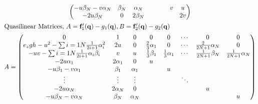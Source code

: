 \documentclass[oneside]{article}
\begin{document}
\begin{gather*}
\begin{pmatrix}
    -u \beta_N - v \alpha_N                                        & \beta_N & \alpha_N  &                       &                        &        & v                      & u                        \\
    -2 u \beta_N                                                   & 0       & 2 \beta_N &                       &                        &        &                        & 2v                       \\
  \end{pmatrix} \\
  \intertext{Quasilinear Matrices, \(A = \mathbf{f}_1'(\mathbf{q}) - g_1(\mathbf{q}), B = \mathbf{f}_2'(\mathbf{q}) - g_2(\mathbf{q})\)}
  A =
  \begin{pmatrix}
    0                                                               & 1          & 0        & 0                     & 0                      & \cdots & 0                         & 0                       \\
    e_{z} g h - u^{2} - \sum{i = 1}{N}{\frac{1}{2i + 1} \alpha_i^2} & 2 u        & 0        & \frac{2}{3} \alpha_1  & 0                      & \cdots & \frac{2}{2N + 1} \alpha_N & 0                       \\
    -uv - \sum{i = 1}{N}{\frac{1}{2i + 1} \alpha_i \beta_i}         & v          & u        & \frac{1}{3} \beta_{1} & \frac{1}{3} \alpha_{1} & \cdots & \frac{1}{2N+1} \beta_N    & \frac{1}{2N+1} \alpha_N \\
    -2 u \alpha_1                                                   & 2 \alpha_1 & 0        & u                     &                        &        &                           &                         \\
    -u \beta_1 - v \alpha_1                                         & \beta_1    & \alpha_1 &                       & u                      &        &                           &                         \\
    \vdots                                                          & \vdots     & \vdots   &                       &                        & \ddots &                           &                         \\
    -2 u \alpha_N                                                   & 2 \alpha_N & 0        &                       &                        &        & u                         &                         \\
    -u \beta_N - v \alpha_N                                         & \beta_N    & \alpha_N &                       &                        &        &                           & u                       \\

\end{pmatrix}
\end{gather*}
\end{document}
